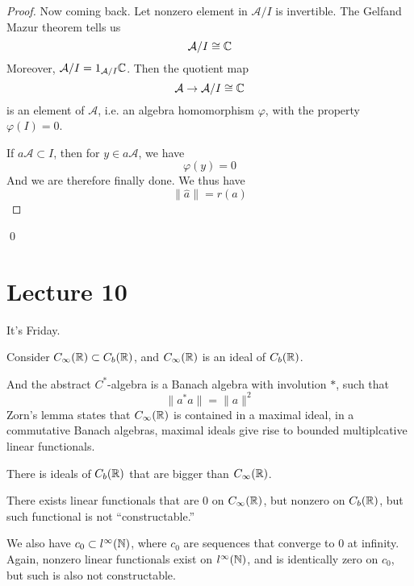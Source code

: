 \begin{proof}
    Now coming back. Let nonzero element in $\mathcal{A}/I$ is invertible. The Gelfand Mazur theorem tells us
    \begin{equation*}
        \mathcal{A}/I\cong \mathbb{C}
    \end{equation*}
    Moreover, $\mathcal{A}/I=1_{\mathcal{A}/I}\mathbb{C}$. Then the quotient map
    \begin{equation*}
        \mathcal{A}\to\mathcal{A}/I\cong\mathbb{C}
    \end{equation*}
    is an element of $\mathcal{A}$, i.e. an algebra homomorphism $\varphi$, with the property $\varphi(I)=0$.

    If $a\mathcal{A}\subset I$, then for $y\in a\mathcal{A}$, we have
    \begin{equation*}
        \varphi(y)=0
    \end{equation*}
    And we are therefore finally done. We thus have
    \begin{equation*}
        \|\widehat{a}\|=r(a)
    \end{equation*}
\end{proof}
\qed

\section{Lecture 10}
It's Friday.

Consider $C_\infty(\mathbb{R})\subset C_b(\mathbb{R})$, and $C_\infty(\mathbb{R})$ is an ideal of $C_b(\mathbb{R})$.

And the abstract $C^*$-algebra is a Banach algebra with involution $*$, such that
\begin{equation*}
    \|a^*a\|=\|a\|^2
\end{equation*}
Zorn's lemma states that $C_\infty(\mathbb{R})$ is contained in a maximal ideal, in a commutative Banach algebras, maximal ideals give rise to bounded multiplcative linear functionals.

\begin{remark}
    There is ideals of $C_b(\mathbb{R})$ that are bigger than $C_\infty(\mathbb{R})$.
\end{remark}

There exists linear functionals that are 0 on $C_\infty(\mathbb{R})$, but nonzero on $C_b(\mathbb{R})$, but such functional is not ``constructable.''

We also have $c_0\subset l^\infty(\mathbb{N})$, where $c_0$ are sequences that converge to 0 at infinity. Again, nonzero linear functionals exist on $l^\infty(\mathbb{N})$, and is identically zero on $c_0$, but such is also not constructable.

